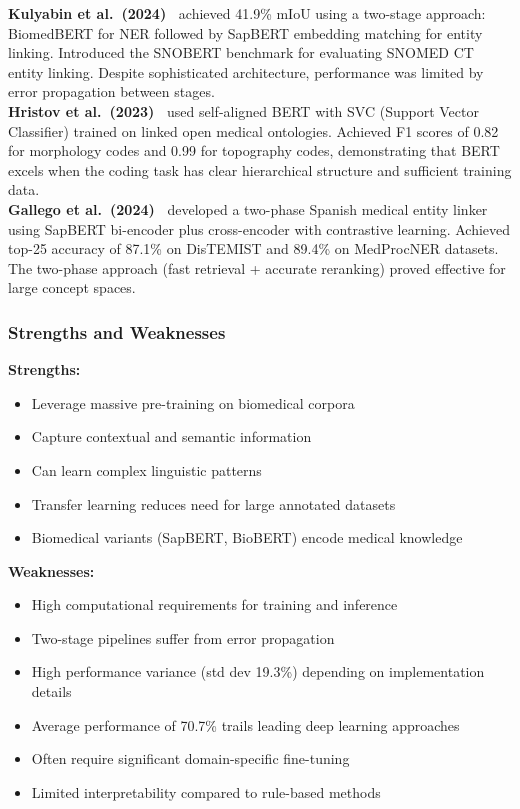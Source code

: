 \textbf{Kulyabin et al.~(2024)~\cite{Kulyabin:2024}} achieved 41.9\% mIoU using a two-stage approach: BiomedBERT for NER followed by SapBERT embedding matching for entity linking. Introduced the SNOBERT benchmark for evaluating SNOMED CT entity linking. Despite sophisticated architecture, performance was limited by error propagation between stages.\\

\textbf{Hristov et al.~(2023)~\cite{Hristov:2023}} used self-aligned BERT with SVC (Support Vector Classifier) trained on linked open medical ontologies. Achieved F1 scores of 0.82 for morphology codes and 0.99 for topography codes, demonstrating that BERT excels when the coding task has clear hierarchical structure and sufficient training data.\\

\textbf{Gallego et al.~(2024)~\cite{Gallego:2024}} developed a two-phase Spanish medical entity linker using SapBERT bi-encoder plus cross-encoder with contrastive learning. Achieved top-25 accuracy of 87.1\% on DisTEMIST and 89.4\% on MedProcNER datasets. The two-phase approach (fast retrieval + accurate reranking) proved effective for large concept spaces.

\subsubsection{Strengths and Weaknesses}

\textbf{Strengths:}
\begin{itemize}
    \item Leverage massive pre-training on biomedical corpora
    \item Capture contextual and semantic information
    \item Can learn complex linguistic patterns
    \item Transfer learning reduces need for large annotated datasets
    \item Biomedical variants (SapBERT, BioBERT) encode medical knowledge
\end{itemize}

\textbf{Weaknesses:}
\begin{itemize}
    \item High computational requirements for training and inference
    \item Two-stage pipelines suffer from error propagation
    \item High performance variance (std dev 19.3\%) depending on implementation details
    \item Average performance of 70.7\% trails leading deep learning approaches
    \item Often require significant domain-specific fine-tuning
    \item Limited interpretability compared to rule-based methods
\end{itemize}

